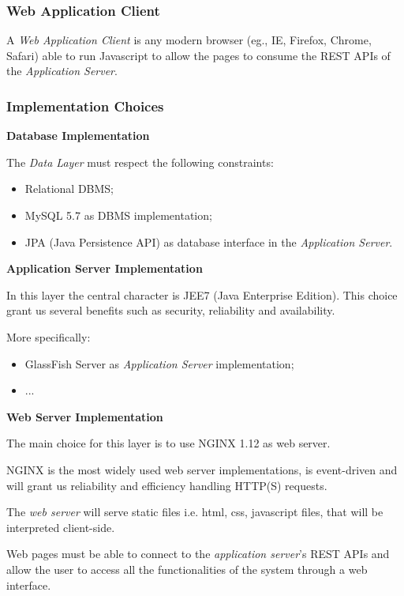 \documentclass{article}
\begin{document}
	\subsubsection{Web Application Client}
	A \textit{Web Application Client} is any modern browser (eg., IE, Firefox, Chrome, Safari) able to run Javascript to allow the pages to consume the REST APIs of the \textit{Application Server}.


	\subsubsection{Implementation Choices}

	\textbf{Database Implementation}

	\medskip
	\noindent
	The \textit{Data Layer} must respect the following constraints: 
	\begin{itemize}
	\item Relational DBMS;
	\item MySQL 5.7 as DBMS implementation;
	\item JPA (Java Persistence API) as database interface in the \textit{Application Server}.
	\end{itemize}

	\bigskip
	\noindent
	\textbf{Application Server Implementation}

	\medskip
	\noindent
	In this layer the central character is JEE7 (Java Enterprise Edition).
	This choice grant us several benefits such as security, reliability and availability.


	More specifically:

	\begin{itemize}
	\item GlassFish Server as \textit{Application Server} implementation;
	\item ...
	\end{itemize}


	\bigskip
	\noindent
	\textbf{Web Server Implementation}

	\medskip
	\noindent
	The main choice for this layer is to use NGINX 1.12 as web server.

	NGINX is the most widely used web server implementations, is event-driven and will grant us reliability and efficiency handling HTTP(S) requests.

	\bigskip
	The \textit{web server} will serve static files i.e. html, css, javascript files, that will be interpreted client-side.

	Web pages must be able to connect to the \textit{application server}'s REST APIs and allow the user to access all the functionalities of the system through a web interface.
\end{document}
